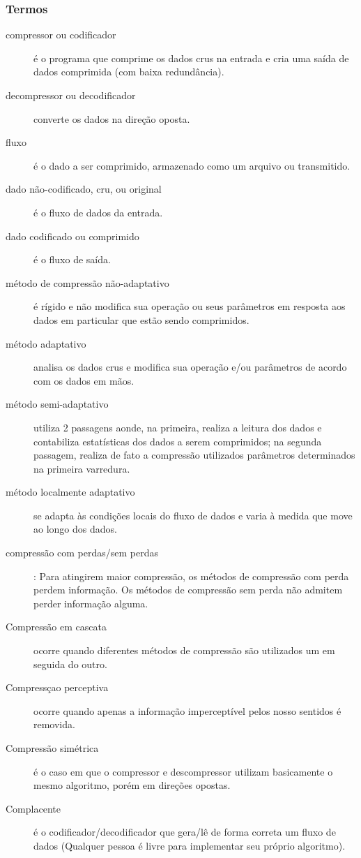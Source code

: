 \begin{frame}[allowframebreaks]
  \frametitle{Termos}
  \begin{description}
  \item[compressor ou codificador] é o programa que comprime os dados crus na entrada e cria uma saída de dados
  comprimida (com baixa redundância).
  \item[decompressor ou decodificador] converte os dados na direção oposta.
  \item[fluxo] é o dado a ser comprimido, armazenado como um arquivo ou transmitido.
  \item[dado não-codificado, cru, ou original] é o fluxo de dados da entrada.
  \item[dado codificado ou comprimido] é o fluxo de saída.
  \item[método de compressão não-adaptativo] é rígido e não modifica sua operação ou seus parâmetros em resposta
  aos dados em particular que estão sendo comprimidos.
  \item[método adaptativo] analisa os dados crus e modifica sua operação e/ou parâmetros de acordo com os dados em mãos.
  \item[método semi-adaptativo] utiliza 2 passagens aonde, na primeira, realiza a leitura dos dados e
  contabiliza estatísticas dos dados a serem comprimidos; na segunda passagem, realiza de fato a compressão
  utilizados parâmetros determinados na primeira varredura.
  \item[método localmente adaptativo] se adapta às condições locais do fluxo de dados e varia à medida que
  move ao longo dos dados.
  \item[compressão com perdas/sem perdas] : Para atingirem maior compressão, os métodos de compressão com perda
  perdem informação. Os métodos de compressão sem perda não admitem perder informação alguma.
  \item[Compressão em cascata] ocorre quando diferentes métodos de compressão são utilizados um em seguida do outro.
  \item[Compressçao perceptiva] ocorre quando apenas a informação imperceptível pelos nosso sentidos é removida.
  \item[Compressão simétrica] é o caso em que o compressor e descompressor utilizam basicamente o mesmo algoritmo,
  porém em direções opostas.
  \item[Complacente] é o codificador/decodificador que gera/lê de forma correta um fluxo de dados (Qualquer pessoa
  é livre para implementar seu próprio algoritmo).

\end{description}
\end{frame}
